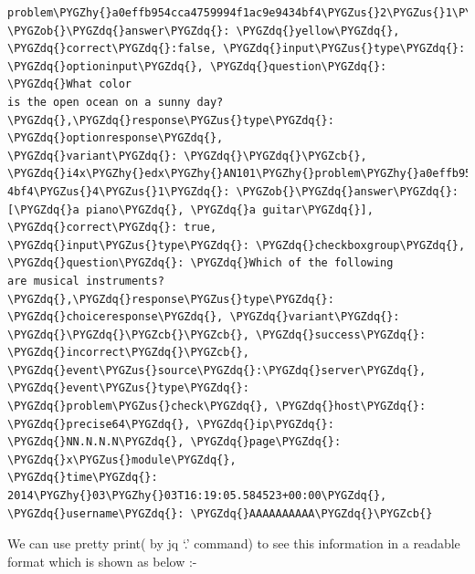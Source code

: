 \documentclass[a4paper,12pt,oneside]{sphinxmanual}
\def\PYGZus{\char`\_}
\def\PYGZob{\char`\{}
\def\PYGZcb{\char`\}}
\def\PYGZhy{\char`\-}
\def\PYGZdq{\char`\"}
\begin{document}
\begin{Verbatim}[commandchars=\\\{\}]
problem\PYGZhy{}a0effb954cca4759994f1ac9e9434bf4\PYGZus{}2\PYGZus{}1\PYGZdq{}: \PYGZob{}\PYGZdq{}answer\PYGZdq{}: \PYGZdq{}yellow\PYGZdq{},
\PYGZdq{}correct\PYGZdq{}:false, \PYGZdq{}input\PYGZus{}type\PYGZdq{}: \PYGZdq{}optioninput\PYGZdq{}, \PYGZdq{}question\PYGZdq{}: \PYGZdq{}What color
is the open ocean on a sunny day?\PYGZdq{},\PYGZdq{}response\PYGZus{}type\PYGZdq{}: \PYGZdq{}optionresponse\PYGZdq{},
\PYGZdq{}variant\PYGZdq{}: \PYGZdq{}\PYGZdq{}\PYGZcb{}, \PYGZdq{}i4x\PYGZhy{}edx\PYGZhy{}AN101\PYGZhy{}problem\PYGZhy{}a0effb954cca4759994f1ac9e943
4bf4\PYGZus{}4\PYGZus{}1\PYGZdq{}: \PYGZob{}\PYGZdq{}answer\PYGZdq{}: [\PYGZdq{}a piano\PYGZdq{}, \PYGZdq{}a guitar\PYGZdq{}], \PYGZdq{}correct\PYGZdq{}: true,
\PYGZdq{}input\PYGZus{}type\PYGZdq{}: \PYGZdq{}checkboxgroup\PYGZdq{}, \PYGZdq{}question\PYGZdq{}: \PYGZdq{}Which of the following
are musical instruments?\PYGZdq{},\PYGZdq{}response\PYGZus{}type\PYGZdq{}: \PYGZdq{}choiceresponse\PYGZdq{}, \PYGZdq{}variant\PYGZdq{}:
\PYGZdq{}\PYGZdq{}\PYGZcb{}\PYGZcb{}, \PYGZdq{}success\PYGZdq{}: \PYGZdq{}incorrect\PYGZdq{}\PYGZcb{}, \PYGZdq{}event\PYGZus{}source\PYGZdq{}:\PYGZdq{}server\PYGZdq{}, \PYGZdq{}event\PYGZus{}type\PYGZdq{}:
\PYGZdq{}problem\PYGZus{}check\PYGZdq{}, \PYGZdq{}host\PYGZdq{}: \PYGZdq{}precise64\PYGZdq{}, \PYGZdq{}ip\PYGZdq{}: \PYGZdq{}NN.N.N.N\PYGZdq{}, \PYGZdq{}page\PYGZdq{}: \PYGZdq{}x\PYGZus{}module\PYGZdq{},
\PYGZdq{}time\PYGZdq{}: 2014\PYGZhy{}03\PYGZhy{}03T16:19:05.584523+00:00\PYGZdq{}, \PYGZdq{}username\PYGZdq{}: \PYGZdq{}AAAAAAAAAA\PYGZdq{}\PYGZcb{}
\end{Verbatim}

We can use pretty print( by jq `.' command) to see this information in a readable format which is shown as below :-
\end{document}
